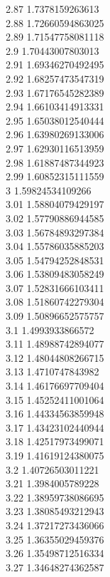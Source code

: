 {2.87	1.7378159263613\\
2.88	1.72660594863025\\
2.89	1.71547758081118\\
2.9	1.70443007803013\\
2.91	1.69346270492495\\
2.92	1.68257473547319\\
2.93	1.67176545282389\\
2.94	1.66103414913331\\
2.95	1.65038012540444\\
2.96	1.63980269133006\\
2.97	1.62930116513959\\
2.98	1.61887487344923\\
2.99	1.60852315111559\\
3	1.59824534109266\\
3.01	1.58804079429197\\
3.02	1.57790886944585\\
3.03	1.56784893297384\\
3.04	1.55786035885203\\
3.05	1.54794252848531\\
3.06	1.53809483058249\\
3.07	1.52831666103411\\
3.08	1.51860742279304\\
3.09	1.50896652575757\\
3.1	1.4993933866572\\
3.11	1.48988742894077\\
3.12	1.48044808266715\\
3.13	1.4710747843982\\
3.14	1.46176697709404\\
3.15	1.45252411001064\\
3.16	1.44334563859948\\
3.17	1.43423102440944\\
3.18	1.42517973499071\\
3.19	1.41619124380075\\
3.2	1.40726503011221\\
3.21	1.3984005789228\\
3.22	1.38959738086695\\
3.23	1.38085493212943\\
3.24	1.37217273436066\\
3.25	1.36355029459376\\
3.26	1.35498712516334\\
3.27	1.34648274362587\\
}
